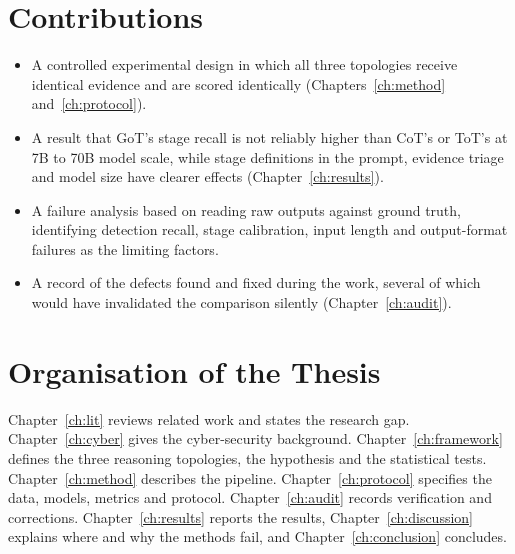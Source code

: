 \section{Contributions}
\begin{itemize}
\item A controlled experimental design in which all three topologies receive identical evidence and are scored identically (Chapters~\ref{ch:method} and~\ref{ch:protocol}).
\item A result that GoT's stage recall is not reliably higher than CoT's or ToT's at 7B to 70B model scale, while stage definitions in the prompt, evidence triage and model size have clearer effects (Chapter~\ref{ch:results}).
\item A failure analysis based on reading raw outputs against ground truth, identifying detection recall, stage calibration, input length and output-format failures as the limiting factors.
\item A record of the defects found and fixed during the work, several of which would have invalidated the comparison silently (Chapter~\ref{ch:audit}).
\end{itemize}

\section{Organisation of the Thesis}
Chapter~\ref{ch:lit} reviews related work and states the research gap. Chapter~\ref{ch:cyber} gives the cyber-security background. Chapter~\ref{ch:framework} defines the three reasoning topologies, the hypothesis and the statistical tests. Chapter~\ref{ch:method} describes the pipeline. Chapter~\ref{ch:protocol} specifies the data, models, metrics and protocol. Chapter~\ref{ch:audit} records verification and corrections. Chapter~\ref{ch:results} reports the results, Chapter~\ref{ch:discussion} explains where and why the methods fail, and Chapter~\ref{ch:conclusion} concludes.
